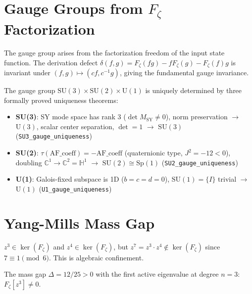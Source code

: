 \section{Gauge Groups from \texorpdfstring{$F_\zeta$}{Fζ} Factorization}
\label{sec:mat_gauge_groups}

The gauge group arises from the factorization freedom of the input state function. The derivation defect $\delta(f,g) = F_\zeta(fg) - f F_\zeta(g) - F_\zeta(f)g$ is invariant under $(f,g) \mapsto (cf, c^{-1}g)$, giving the fundamental gauge invariance.

The gauge group $\mathrm{SU}(3) \times \mathrm{SU}(2) \times \mathrm{U}(1)$ is uniquely determined by three formally proved uniqueness theorems:
\begin{itemize}
\item \textbf{SU(3)}: SY mode space has rank 3 ($\det M_{\mathrm{SY}} \neq 0$), norm preservation $\to$ $\mathrm{U}(3)$, scalar center separation, $\det = 1$ $\to$ $\mathrm{SU}(3)$ (\texttt{SU3\_gauge\_uniqueness})
\item \textbf{SU(2)}: $\tau(\mathrm{AF\_coeff}) = -\mathrm{AF\_coeff}$ (quaternionic type, $J^2 = -12 < 0$), doubling $\mathbb{C}^1 \to \mathbb{C}^2 = \mathbb{H}^1$ $\to$ $\mathrm{SU}(2) \cong \mathrm{Sp}(1)$ (\texttt{SU2\_gauge\_uniqueness})
\item \textbf{U(1)}: Galois-fixed subspace is 1D ($b = c = d = 0$), $\mathrm{SU}(1) = \{I\}$ trivial $\to$ $\mathrm{U}(1)$ (\texttt{U1\_gauge\_uniqueness})
\end{itemize}

\section{Yang-Mills Mass Gap}
\label{sec:mat_yang_mills}

\begin{theorem}
\label{thm:mat_ker_not_subalgebra}
\leanok
$z^3 \in \ker(F_\zeta)$ and $z^4 \in \ker(F_\zeta)$, but $z^7 = z^3 \cdot z^4 \notin \ker(F_\zeta)$ since $7 \equiv 1 \pmod{6}$. This is algebraic confinement.
\end{theorem}

\begin{theorem}
\label{thm:mat_yang_mills_gap}
\leanok
The mass gap $\Delta = 12/25 > 0$ with the first active eigenvalue at degree $n = 3$: $F_\zeta[z^3] \neq 0$.
\end{theorem}


